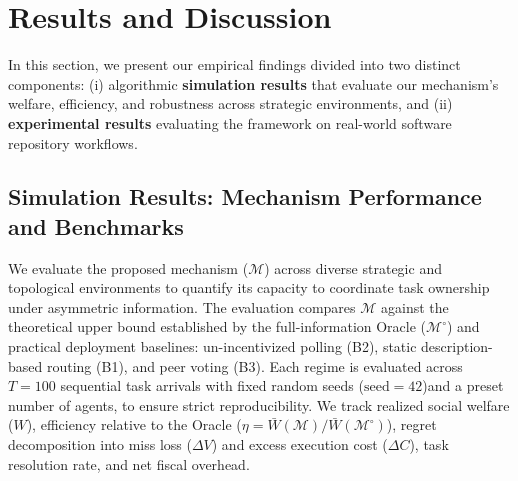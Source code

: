 \documentclass{article}
\theoremstyle{definition}
\begin{document}
\section{Results and Discussion}
\label{sec:results}

In this section, we present our empirical findings divided into two distinct components: (i) algorithmic \textbf{simulation results} that evaluate our mechanism's welfare, efficiency, and robustness across strategic environments, and (ii) \textbf{experimental results} evaluating the framework on real-world software repository workflows.

\subsection{Simulation Results: Mechanism Performance and Benchmarks}
\label{subsec:sim_results}

We evaluate the proposed mechanism ($\mathcal{M}$) across diverse strategic and topological environments to quantify its capacity to coordinate task ownership under asymmetric information. The evaluation compares $\mathcal{M}$ against the theoretical upper bound established by the full-information Oracle ($\mathcal{M}^\circ$) and practical deployment baselines: un-incentivized polling (B2), static description-based routing (B1), and peer voting (B3). Each regime is evaluated across $T = 100$ sequential task arrivals with fixed random seeds ($\text{seed}=42$)and a preset number of agents, to ensure strict reproducibility. We track realized social welfare ($W$), efficiency relative to the Oracle ($\eta = \bar{W}(\mathcal{M}) / \bar{W}(\mathcal{M}^\circ)$), regret decomposition into miss loss ($\Delta V$) and excess execution cost ($\Delta C$), task resolution rate, and net fiscal overhead.
\end{document}
